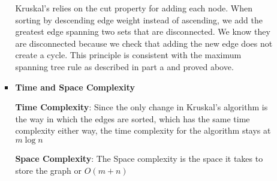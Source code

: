 \documentclass[letterpaper,11pt]{article}
\begin{document}
\begin{enumerate}
\begin{enumerate}
\begin{itemize}
                    Kruskal's relies on the cut property for adding each node. 
                    When sorting by descending edge weight instead of 
                    ascending, we add the greatest edge spanning two sets that
                    are disconnected. We know they are disconnected because we 
                    check that adding the new edge does not create a cycle. This
                    principle is consistent with the maximum spanning tree rule
                    as described in part a and proved above. 

                \item \textbf{Time and Space Complexity}
                    
                    \textbf{Time Complexity}: Since the only change in Kruskal's algorithm is the 
                    way in which the edges are sorted, which has the same time
                    complexity either way, the time complexity for the algorithm
                    stays at $m\log{n}$

                    \textbf{Space Complexity}: The Space complexity is the space
                    it takes to store the graph or $O\left( m + n \right) $


            \end{itemize}
            


    \end{enumerate}


\end{enumerate}
\end{document}
